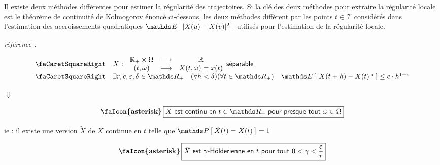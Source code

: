 
Il existe deux méthodes différentes pour estimer la régularité des trajectoires. Si la clé des deux méthodes pour extraire la régularité locale est le théorème de continuité de Kolmogorov énoncé ci-dessous, les deux méthodes diffèrent par les points $t \in \mathcal T$ considérés dans l'estimation des accroissements quadratiques $\esperance{ \vert X(u) - X(v) \vert^2 }$ utilisés pour l'estimation de la régularité locale.

\begin{thm}
	\emph{référence : } ~\cite[thm : 2.197 | page : 145]{capasso2015introduction}

	\begin{equation*}
		\begin{array}{ll}
			\textsf{\faCaretSquareRight}
			 & X : \, \begin{array}{ccc}
				          \mathbb{R_+} \times \Omega & \longrightarrow & \mathbb{R}          \\
				          (t, \omega)                & \longmapsto     & X(t, \omega) = x(t)
			          \end{array} \textsf{séparable}
			\\
			\textsf{\faCaretSquareRight}
			 & \exists r,c, \varepsilon, \delta \in \mathds R_+ \quad (\forall h < \delta)(\forall t \in \mathds R_+)  \quad \esperance{ | X(t+h) - X(t) |^r } \leq c\cdot h^{1+\varepsilon}
		\end{array}
	\end{equation*}

	\begin{center}
		$\Downarrow$
	\end{center}
	\begin{equation*}
		\textbf{\faIcon{asterisk}}\, \boxed{
			X \textsf{ est continu en } t \in \mathds R_+ \textsf{ pour presque tout } \omega \in \Omega
		}
	\end{equation*}
	\begin{center}
		ie : il existe une version $\tilde X$ de $X$ continue en $t$ telle que $\proba{ \tilde X(t) = X(t)} = 1$
	\end{center}

	\begin{equation*}
		\textbf{\faIcon{asterisk}} \, \boxed{
			\tilde{X} \textsf{ est } \gamma \textsf{-Hölderienne en } t  \textsf{ pour tout } 0 < \gamma < \frac{\varepsilon}{r}
		}
	\end{equation*}
	\label{thm:kolmogorov_continuite}
\end{thm}

